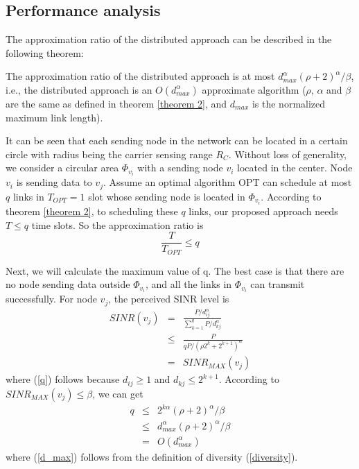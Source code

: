 \documentclass[conference]{IEEEtran}
\begin{document}
\subsection{Performance analysis}
The approximation ratio of the distributed approach can be described
in the following theorem:

\begin{theorm}\label{theorem 3}
The approximation ratio of the distributed approach is at most
$d_{max}^\alpha(\rho +2)^\alpha / \beta$, i.e., the distributed
approach is an $O(d_{max}^\alpha)$ approximate algorithm ($\rho$,
$\alpha$ and $\beta$ are the same as defined in theorem \ref{theorem
2}, and $d_{max}$ is the normalized maximum link length).
\end{theorm}
\begin{IEEEproof}
It can be seen that each sending node in the network can be located
in a certain circle with radius being the carrier sensing range
$R_C$. Without loss of generality, we consider a circular area
$\Phi_{v_i}$ with a sending node $v_i$ located in the center. Node
$v_i$ is sending data to $v_j$. Assume an optimal algorithm OPT can
schedule at most $q$ links in $T_{OPT}=1$ slot whose sending node is
located in $\Phi_{v_i}$. According to theorem \ref{theorem 2}, to
scheduling these $q$ links, our proposed approach needs $T\leq q$
time slots. So the approximation ratio is
\begin{displaymath}
\frac{T}{T_{OPT}} \leq q
\end{displaymath}

Next, we will calculate the maximum value of q. The best case is
that there are no node sending data outside $\Phi_{v_i}$, and all
the links in $\Phi_{v_i}$ can transmit successfully. For node $v_j$,
the perceived  SINR level is
\begin{eqnarray}
SINR(v_j)&=&\frac{P/d_{ij}^\alpha}{\sum_{k=1}^{q}
P/d_{kj}^\alpha}\nonumber \\
         &\leq &\frac{P}{q P/(\rho
         2^k+2^{k+1})^\alpha}\label{q}\\
         &=& SINR_{MAX}(v_j)\nonumber
\end{eqnarray}
where (\ref{q}) follows because $d_{ij}\geq 1$ and $d_{kj}\leq
2^{k+1}$. According to $SINR_{MAX}(v_j)\leq \beta$, we can get
\begin{eqnarray}
q &\leq & 2^{k\alpha}(\rho +2)^\alpha / \beta \nonumber \\
  &\leq & d_{max}^\alpha(\rho +2)^\alpha / \beta \label{d_max}\\
  &=& O(d_{max}^\alpha)\nonumber
\end{eqnarray}
where (\ref{d_max}) follows from the definition of diversity
(\ref{diversity}).
\end{IEEEproof}
\end{document}
